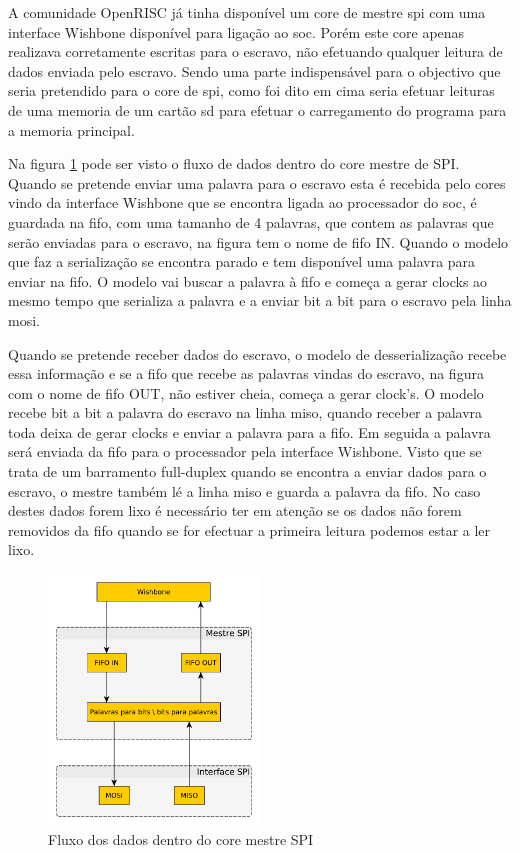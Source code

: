 A comunidade OpenRISC já tinha disponível um core de mestre \acrshort{spi} com uma interface Wishbone disponível para ligação ao \acrshort{soc}. Porém este core apenas realizava corretamente escritas para o escravo, não efetuando qualquer leitura de dados enviada pelo escravo. Sendo uma parte indispensável para o objectivo que seria pretendido para o core de \acrshort{spi}, como foi dito em cima seria efetuar leituras de uma memoria de um cartão \acrshort{sd} para efetuar o carregamento do programa para a memoria principal.

Na figura \ref{fig:diagrama_SPI_master} pode ser visto o fluxo de dados dentro do core mestre de SPI. Quando se pretende enviar uma palavra para o escravo esta é recebida pelo cores vindo da interface Wishbone que se encontra ligada ao processador do \acrshort{soc}, é guardada na \acrshort{fifo}, com uma tamanho de 4 palavras, que contem as palavras que serão enviadas para o escravo, na figura tem o nome de \acrshort{fifo} IN. Quando o modelo que faz a serialização se encontra parado e tem disponível uma palavra para enviar na \acrshort{fifo}. O modelo vai buscar a palavra à \acrshort{fifo} e começa a gerar clocks ao mesmo tempo que serializa a palavra e a enviar bit a bit para o escravo pela linha \acrshort{mosi}.

Quando se pretende receber dados do escravo, o modelo de desserialização recebe essa informação e se a \acrshort{fifo} que recebe as palavras vindas do escravo, na figura com o nome de \acrshort{fifo} OUT, não estiver cheia, começa a gerar clock's. O modelo recebe bit a bit a palavra do escravo na linha \acrshort{miso}, quando receber a palavra toda deixa de gerar clocks e enviar a palavra para a \acrshort{fifo}. Em seguida a palavra será enviada da \acrshort{fifo} para o processador pela interface Wishbone. Visto que se trata de um barramento full-duplex quando se encontra a enviar dados para o escravo, o mestre também lé a linha \acrshort{miso} e guarda a palavra da \acrshort{fifo}. No caso destes dados forem lixo é necessário ter em atenção se os dados não forem removidos da \acrshort{fifo} quando se for efectuar a primeira leitura podemos estar a ler lixo. 

\begin{figure}[!htb]
  \centering
  \includegraphics[width=0.50\textwidth]{grafos/diagrama_SPI_master.pdf}
  \caption[Fluxo dos dados dentro do core mestre SPI]{Fluxo dos dados dentro do core mestre SPI}
  \label{fig:diagrama_SPI_master}
\end{figure}

